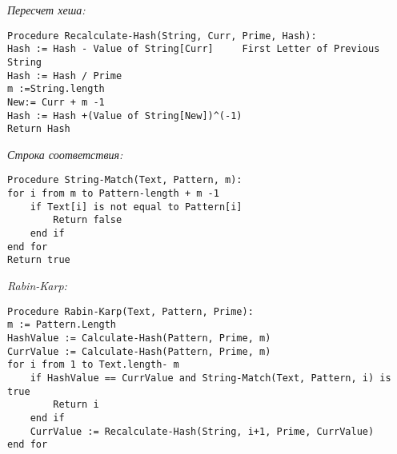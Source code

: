 \textit{Пересчет хеша:}

\vspace{\baselineskip}
\begin{tcolorbox}
\begin{verbatim}
Procedure Recalculate-Hash(String, Curr, Prime, Hash):
Hash := Hash - Value of String[Curr]     First Letter of Previous String
Hash := Hash / Prime
m :=String.length
New:= Curr + m -1
Hash := Hash +(Value of String[New])^(-1)
Return Hash
\end{verbatim}
\end{tcolorbox}
\vspace{\baselineskip}

\textit{Строка соответствия:}

\vspace{\baselineskip}
\begin{tcolorbox}
\begin{verbatim}
Procedure String-Match(Text, Pattern, m):
for i from m to Pattern-length + m -1
    if Text[i] is not equal to Pattern[i]
        Return false
    end if
end for
Return true
\end{verbatim}
\end{tcolorbox}
\vspace{\baselineskip}

\textit{Rabin-Karp:}

\vspace{\baselineskip}
\begin{tcolorbox}
\begin{verbatim}
Procedure Rabin-Karp(Text, Pattern, Prime):
m := Pattern.Length
HashValue := Calculate-Hash(Pattern, Prime, m)
CurrValue := Calculate-Hash(Pattern, Prime, m)
for i from 1 to Text.length- m
    if HashValue == CurrValue and String-Match(Text, Pattern, i) is true
        Return i
    end if    
    CurrValue := Recalculate-Hash(String, i+1, Prime, CurrValue)
end for
\end{verbatim}
\end{tcolorbox}
\vspace{\baselineskip}
